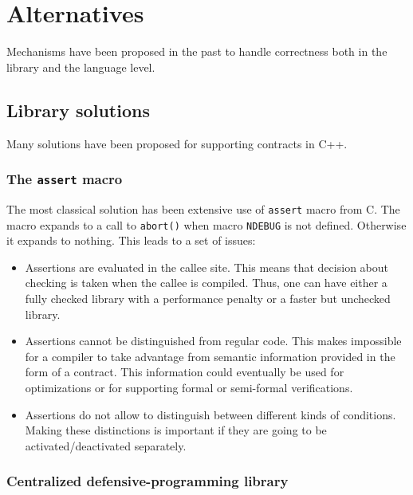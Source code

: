 \section{Alternatives}

Mechanisms have been proposed in the past to handle correctness both in the
library and the language level.

\subsection{Library solutions}

Many solutions have been proposed for supporting contracts in C++.

\subsubsection{The \texttt{assert} macro}

The most classical solution has been extensive use of \texttt{assert} macro from
C. The macro expands to a call to \texttt{abort()} when macro \texttt{NDEBUG} is
not defined. Otherwise it expands to nothing. This leads to a set of issues:

\begin{itemize}

\item Assertions are evaluated in the callee site. This means that decision
about checking is taken when the callee is compiled. Thus, one can have either a
fully checked library with a performance penalty or a faster but unchecked
library.

\item Assertions cannot be distinguished from regular code. This makes impossible
for a compiler to take advantage from semantic information provided in the form
of a contract. This information could eventually be used for optimizations or
for supporting formal or semi-formal verifications.

\item Assertions do not allow to distinguish between different kinds of
conditions. Making these distinctions is important if they are going to be
activated/deactivated separately.

\end{itemize}

\subsubsection{Centralized defensive-programming library}

